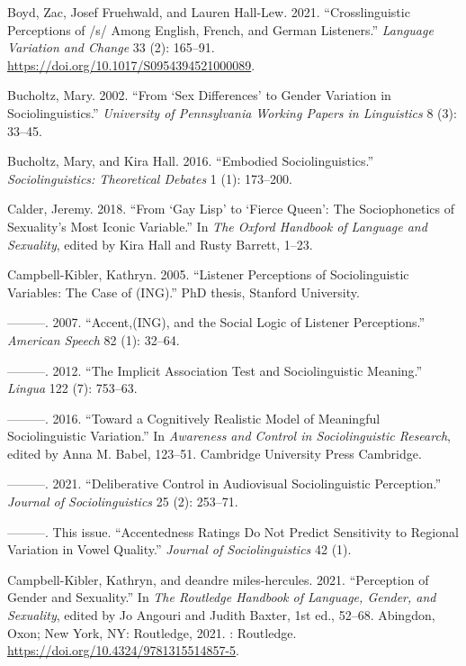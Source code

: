 \documentclass[
  letterpaper,
  DIV=11,
  numbers=noendperiod]{scrartcl}
\newlength{\cslhangindent}
\newenvironment{CSLReferences}[2] %
 {\begin{list}{}{%
  \setlength{\itemindent}{0pt}
  \setlength{\leftmargin}{0pt}
  \setlength{\parsep}{0pt}
  \ifodd #1
   \setlength{\leftmargin}{\cslhangindent}
   \setlength{\itemindent}{-1\cslhangindent}
  \fi
  \setlength{\itemsep}{#2\baselineskip}}}
 {\end{list}}
\begin{document}
\begin{CSLReferences}{1}{0}
Boyd, Zac, Josef Fruehwald, and Lauren Hall-Lew. 2021.
{``Crosslinguistic Perceptions of /s/ Among English, French, and German
Listeners.''} \emph{Language Variation and Change} 33 (2): 165--91.
\url{https://doi.org/10.1017/S0954394521000089}.

Bucholtz, Mary. 2002. {``From {`Sex Differences'} to Gender Variation in
Sociolinguistics.''} \emph{University of Pennsylvania Working Papers in
Linguistics} 8 (3): 33--45.

Bucholtz, Mary, and Kira Hall. 2016. {``Embodied Sociolinguistics.''}
\emph{Sociolinguistics: Theoretical Debates} 1 (1): 173--200.

Calder, Jeremy. 2018. {``From {`Gay Lisp'} to {`Fierce Queen'}: The
Sociophonetics of Sexuality's Most Iconic Variable.''} In \emph{The
Oxford Handbook of Language and Sexuality}, edited by Kira Hall and
Rusty Barrett, 1--23.

Campbell-Kibler, Kathryn. 2005. {``Listener Perceptions of
Sociolinguistic Variables: The Case of (ING).''} PhD thesis, Stanford
University.

---------. 2007. {``Accent,(ING), and the Social Logic of Listener
Perceptions.''} \emph{American Speech} 82 (1): 32--64.

---------. 2012. {``The Implicit Association Test and Sociolinguistic
Meaning.''} \emph{Lingua} 122 (7): 753--63.

---------. 2016. {``Toward a Cognitively Realistic Model of Meaningful
Sociolinguistic Variation.''} In \emph{Awareness and Control in
Sociolinguistic Research}, edited by Anna M. Babel, 123--51. Cambridge
University Press Cambridge.

---------. 2021. {``Deliberative Control in Audiovisual Sociolinguistic
Perception.''} \emph{Journal of Sociolinguistics} 25 (2): 253--71.

---------. This issue. {``Accentedness Ratings Do Not Predict
Sensitivity to Regional Variation in Vowel Quality.''} \emph{Journal of
Sociolinguistics} 42 (1).

Campbell-Kibler, Kathryn, and deandre miles-hercules. 2021.
{``Perception of Gender and Sexuality.''} In \emph{The {Routledge}
{Handbook} of {Language}, {Gender}, and {Sexuality}}, edited by Jo
Angouri and Judith Baxter, 1st ed., 52--68. Abingdon, Oxon; New York,
NY: Routledge, 2021. {\textbar}: Routledge.
\url{https://doi.org/10.4324/9781315514857-5}.


\end{CSLReferences}
\end{document}
